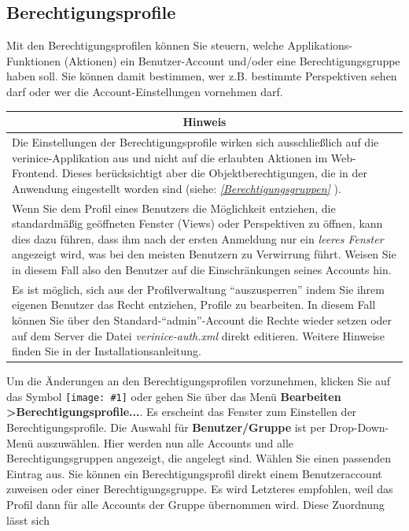 \documentclass[a4paper,10pt]{book}
\newcommand{\icon}[1]{\texttt{[image: \#1]}}
\begin{document}
\subsection{Berechtigungsprofile} \label{Berechtigungsprofile}
Mit den Berechtigungsprofilen können Sie steuern, welche Applikations-Funktionen (Aktionen) ein Benutzer-Account und/oder eine Berechtigungsgruppe
haben soll. Sie können damit bestimmen, wer z.B. bestimmte Perspektiven sehen darf oder wer die Account-Einstellungen vornehmen darf.
\begin{longtable}{| p{} |}
\hline
\multicolumn{1}{|c|}{\textbf{Hinweis}} \\[10pt]
\hline\hline
Die Einstellungen der Berechtigungsprofile wirken sich ausschließlich auf die verinice-Applikation aus und nicht auf die erlaubten Aktionen im Web-Frontend. Dieses berücksichtigt aber die Objektberechtigungen, die in der Anwendung eingestellt worden sind (siehe: {\em \ref{Berechtigungsgruppen} \nameref{Berechtigungsgruppen}}). \\[10pt] \hline
Wenn Sie dem Profil eines Benutzers die Möglichkeit entziehen, die standardmäßig geöffneten Fenster (Views) oder Perspektiven zu öffnen, kann dies dazu führen, dass ihm nach der ersten Anmeldung nur ein \textit{leeres Fenster} angezeigt wird, was bei den meisten Benutzern zu Verwirrung führt. Weisen Sie in diesem Fall also den Benutzer auf die Einschränkungen seines Accounts hin. \\[10pt] \hline
Es ist möglich, sich aus der Profilverwaltung ``auszusperren'' indem Sie ihrem eigenen Benutzer das Recht entziehen, Profile zu bearbeiten. In diesem Fall können Sie über den Standard-``admin''-Account die Rechte wieder setzen oder auf dem Server die Datei \textit{verinice-auth.xml} direkt editieren. Weitere Hinweise finden Sie in der Installationsanleitung. \\[10pt] \hline
\end{longtable}
Um die Änderungen an den Berechtigungsprofilen vorzunehmen, klicken Sie auf das Symbol \icon{Icon/Berechtigungsprofile.png}
oder gehen Sie über das Menü \textbf{Bearbeiten \textgreater Berechtigungsprofile...}. Es erscheint das Fenster zum Einstellen der Berechtigungsprofile.
Die Auswahl für \textbf{Benutzer/Gruppe} ist per Drop-Down-Menü auszuwählen. Hier werden nun alle Accounts und alle Berechtigungsgruppen angezeigt,
die angelegt sind. Wählen Sie einen passenden Eintrag aus. Sie können ein Berechtigungsprofil direkt einem Benutzeraccount zuweisen oder einer
Berechtigungsgruppe. Es wird Letzteres empfohlen, weil das Profil dann für alle Accounts der Gruppe übernommen wird. Diese Zuordnung lässt sich
\end{document}
